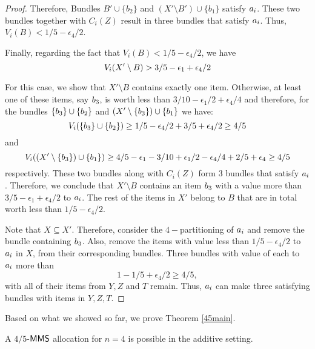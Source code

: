 \begin{proof}
Therefore, Bundles $B' \cup \{b_2\}$ and $(X' \setminus B') \cup \{b_1\}$ satisfy $a_i$. These two bundles together with  $C_i(Z)$ result in three bundles that satisfy $a_i$. Thus, $V_i(B) < 1/5 - \epsilon_4/2$. 

Finally, regarding the fact that $V_i(B) < 1/5 - \epsilon_4/2$, we have 
$$V_i(X' \setminus B)> 3/5  -\epsilon_1 + \epsilon_4/2 $$

For this case, we show that $X'\setminus B$ contains exactly one item. Otherwise, at least one of these items, say $b_3$, is worth less than $3/10 - \epsilon_1/2 + \epsilon_4/4$ and therefore, for the bundles $\{b_3\} \cup \{b_2\}$ and $(X' \setminus \{b_3\}) \cup \{b_1\}$  we have:
$$V_i(\{b_3\} \cup \{b_2\}) \geq 1/5 - \epsilon_4/2 + 3/5+\epsilon_4/2 \geq 4/5$$
and 
$$V_i((X' \setminus \{b_3\}) \cup \{b_1\}) \geq 4/5 - \epsilon_1 - 3/10 + \epsilon_1/2- \epsilon_4/4+ 2/5 + \epsilon_4 \geq 4/5$$
respectively. These two bundles along with $C_i(Z)$ form $3$ bundles that satisfy $a_i$. Therefore, we conclude that $X' \setminus B$ contains an item $b_3$ with a value more than $3/5-\epsilon_1  + \epsilon_4/2$ to $a_i$. The rest of the items in $X'$ belong to $B$ that are in total worth less than $1/5-\epsilon_4/2$.

Note that $X \subseteq X'$. Therefore, consider the $4-$partitioning of $a_i$ and remove the bundle containing $b_3$. Also, remove the items with value less than $1/5 - \epsilon_4/2$ to $a_i$ in $X$, from their corresponding bundles. Three bundles with value of each to $a_i$ more than $$1 - 1/5 + \epsilon_4/2 \geq 4/5,$$ with all of their items from $Y,Z$ and $T$ remain. Thus, $a_i$ can make three satisfying bundles with items in $Y,Z,T$. 
\end{proof}
Based on what we showed so far, we prove Theorem \ref{45main}.
\begin{theorem}
\label{45main}
A $4/5$-$\mathsf{MMS}$ allocation for $n=4$ is possible in the additive setting.
\end{theorem}
